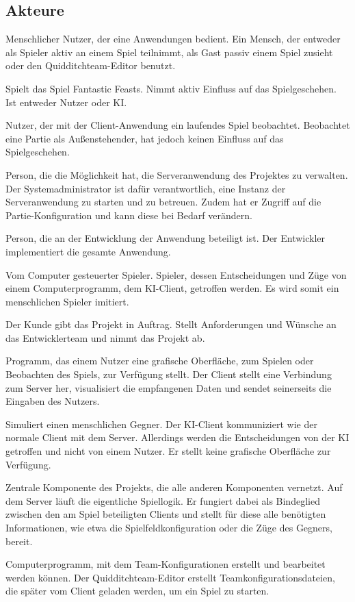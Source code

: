 \subsection{Akteure}

        {Menschlicher Nutzer, der eine Anwendungen bedient.}
        {Ein Mensch, der entweder als Spieler aktiv an einem Spiel teilnimmt, als Gast passiv einem Spiel zusieht oder den Quidditchteam-Editor benutzt.}
        
        {Spielt das Spiel \glqq{}Fantastic Feasts\grqq{}.}
        {Nimmt aktiv Einfluss auf das Spielgeschehen. Ist entweder Nutzer oder KI.}
        
        {Nutzer, der mit der Client-Anwendung ein laufendes Spiel beobachtet.}
        {Beobachtet eine Partie als Außenstehender, hat jedoch keinen Einfluss auf das Spielgeschehen.}
    
        {Person, die die Möglichkeit hat, die Serveranwendung des Projektes zu verwalten.}
        {Der Systemadministrator ist dafür verantwortlich, eine Instanz der Serveranwendung zu starten und zu betreuen. Zudem hat er Zugriff auf die Partie-Konfiguration und kann diese bei Bedarf verändern.}

        {Person, die an der Entwicklung der Anwendung beteiligt ist.}
        {Der Entwickler implementiert die gesamte Anwendung.}	

        {Vom Computer gesteuerter Spieler.}
        {Spieler, dessen Entscheidungen und Züge von einem Computerprogramm, dem KI-Client, getroffen werden. Es wird somit ein menschlichen Spieler imitiert.}

        {Der Kunde gibt das Projekt in Auftrag.}
        {Stellt Anforderungen und Wünsche an das Entwicklerteam und nimmt das Projekt ab.}

        {Programm, das einem Nutzer eine grafische Oberfläche, zum Spielen oder Beobachten des Spiels, zur Verfügung stellt.}
        {Der Client stellt eine Verbindung zum Server her, visualisiert die empfangenen Daten und sendet seinerseits die Eingaben des Nutzers.}

        {Simuliert einen menschlichen Gegner.}
        {Der KI-Client kommuniziert wie der normale Client mit dem Server. Allerdings werden die Entscheidungen von der KI getroffen und nicht von einem Nutzer. Er stellt keine grafische Oberfläche zur Verfügung.}

        {Zentrale Komponente des Projekts, die alle anderen Komponenten vernetzt.}
        {Auf dem Server läuft die eigentliche Spiellogik. Er fungiert dabei als Bindeglied zwischen den am Spiel beteiligten Clients und stellt für diese alle benötigten Informationen, wie etwa die Spielfeldkonfiguration oder die Züge des Gegners, bereit.}
        
        {Computerprogramm, mit dem Team-Konfigurationen erstellt und bearbeitet werden können.}
        {Der Quidditchteam-Editor erstellt Teamkonfigurationsdateien, die später vom Client geladen werden, um ein Spiel zu starten.}
